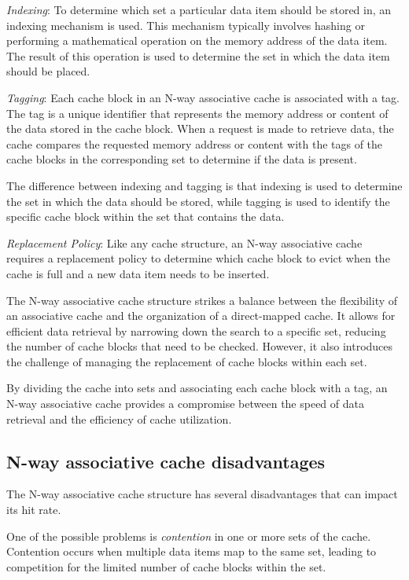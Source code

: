 \documentclass[12pt]{article}
\begin{document}
\textit{Indexing}: To determine which set a particular data item should be stored in, an indexing mechanism is used. This mechanism typically involves hashing or performing a mathematical operation on the memory address of the data item. The result of this operation is used to determine the set in which the data item should be placed.

\textit{Tagging}: Each cache block in an N-way associative cache is associated with a tag. The tag is a unique identifier that represents the memory address or content of the data stored in the cache block. When a request is made to retrieve data, the cache compares the requested memory address or content with the tags of the cache blocks in the corresponding set to determine if the data is present.

The difference between indexing and tagging is that indexing is used to determine the set in which the data should be stored, while tagging is used to identify the specific cache block within the set that contains the data.

\textit{Replacement Policy}: Like any cache structure, an N-way associative cache requires a replacement policy to determine which cache block to evict when the cache is full and a new data item needs to be inserted.

The N-way associative cache structure strikes a balance between the flexibility of an associative cache and the organization of a direct-mapped cache. It allows for efficient data retrieval by narrowing down the search to a specific set, reducing the number of cache blocks that need to be checked. However, it also introduces the challenge of managing the replacement of cache blocks within each set.

By dividing the cache into sets and associating each cache block with a tag, an N-way associative cache provides a compromise between the speed of data retrieval and the efficiency of cache utilization.

\subsection{N-way associative cache disadvantages}

The N-way associative cache structure has several disadvantages that can impact its hit rate.

One of the possible problems is \textit{contention} in one or more sets of the cache. Contention occurs when multiple data items map to the same set, leading to competition for the limited number of cache blocks within the set.
\end{document}
